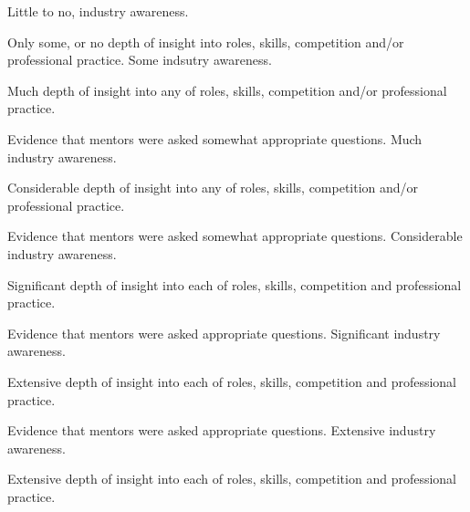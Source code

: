 \documentclass{../../fal_assignment}
\begin{document}
\rubricyearthree

\begin{markingrubric}
%
%
        \grade  \fail     Little to no, industry awareness.
        \par                 Only some, or no depth of insight into roles, skills, competition and/or professional practice.
        \grade 		Some indsutry awareness.
        \par 		Much depth of insight into any of roles, skills, competition and/or professional practice.
        \par 		Evidence that mentors were asked somewhat appropriate questions.
        \grade 		Much industry awareness.
        \par 		Considerable depth of insight into any of roles, skills, competition and/or professional practice.
      \par 		Evidence that mentors were asked somewhat appropriate questions.
        \grade 		Considerable industry awareness.
        \par 		Significant depth of insight into each of roles, skills, competition and professional practice.
        \par 		Evidence that mentors were asked appropriate questions.
        \grade 		Significant industry awareness.
        \par 		Extensive depth of insight into each of roles, skills, competition and professional practice.
        \par 		Evidence that mentors were asked appropriate questions.
        \grade 		Extensive industry awareness.
        \par 		Extensive depth of insight into each of roles, skills, competition and professional practice.

\end{markingrubric}
\end{document}
